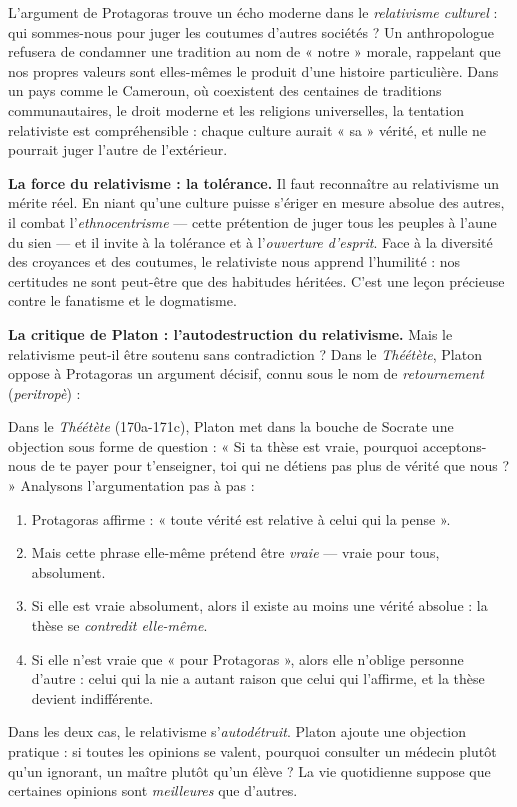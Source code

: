 \documentclass[11pt]{article}
\newcommand{\cle}[1]{{\popxbold\color{popdark}#1}}
\begin{document}
\begin{exemplebox}
L'argument de Protagoras trouve un écho moderne dans le \emph{relativisme culturel} : qui sommes-nous pour juger les coutumes d'autres sociétés ? Un anthropologue refusera de condamner une tradition au nom de « notre » morale, rappelant que nos propres valeurs sont elles-mêmes le produit d'une histoire particulière. Dans un pays comme le Cameroun, où coexistent des centaines de traditions communautaires, le droit moderne et les religions universelles, la tentation relativiste est compréhensible : chaque culture aurait « sa » vérité, et nulle ne pourrait juger l'autre de l'extérieur.
\end{exemplebox}

\textbf{La force du relativisme : la tolérance.} Il faut reconnaître au relativisme un mérite réel. En niant qu'une culture puisse s'ériger en mesure absolue des autres, il combat l'\emph{ethnocentrisme} — cette prétention de juger tous les peuples à l'aune du sien — et il invite à la \cle{tolérance} et à l'\emph{ouverture d'esprit}. Face à la diversité des croyances et des coutumes, le relativiste nous apprend l'humilité : nos certitudes ne sont peut-être que des habitudes héritées. C'est une leçon précieuse contre le fanatisme et le dogmatisme.

\textbf{La critique de Platon : l'autodestruction du relativisme.} Mais le relativisme peut-il être soutenu sans contradiction ? Dans le \emph{Théétète}, Platon oppose à Protagoras un argument décisif, connu sous le nom de \emph{retournement} (\emph{peritropè}) :

\begin{experience}
Dans le \emph{Théétète} (170a-171c), Platon met dans la bouche de Socrate une objection sous forme de question : « Si ta thèse est vraie, pourquoi acceptons-nous de te payer pour t'enseigner, toi qui ne détiens pas plus de vérité que nous ? » Analysons l'argumentation pas à pas :
\begin{enumerate}
\item Protagoras affirme : « toute vérité est relative à celui qui la pense ».
\item Mais cette phrase elle-même prétend être \emph{vraie} — vraie pour tous, absolument.
\item Si elle est vraie absolument, alors il existe au moins une vérité absolue : la thèse se \emph{contredit elle-même}.
\item Si elle n'est vraie que « pour Protagoras », alors elle n'oblige personne d'autre : celui qui la nie a autant raison que celui qui l'affirme, et la thèse devient indifférente.
\end{enumerate}
Dans les deux cas, le relativisme s'\emph{autodétruit}. Platon ajoute une objection pratique : si toutes les opinions se valent, pourquoi consulter un médecin plutôt qu'un ignorant, un maître plutôt qu'un élève ? La vie quotidienne suppose que certaines opinions sont \emph{meilleures} que d'autres.
\end{experience}
\end{document}
